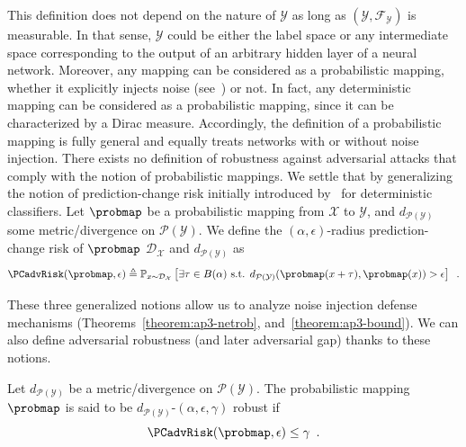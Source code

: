 This definition does not depend on the nature of $\mathcal{Y}$ as long as $(\mathcal{Y},\mathcal{F}_{\mathcal{Y}})$ is measurable.
In that sense, $\mathcal{Y}$ could be either the label space or any intermediate space corresponding to the output of an arbitrary hidden layer of a neural network.
Moreover, any mapping can be considered as a probabilistic mapping, whether it explicitly injects noise (see~\citet{lecuyer2018certified,rakin2018parametric,dhillon2018stochastic}) or not.
In fact, any deterministic mapping can be considered as a probabilistic mapping, since it can be characterized by a Dirac measure.
Accordingly, the definition of a probabilistic mapping is fully general and equally treats networks with or without noise injection.
There exists no definition of robustness against adversarial attacks that comply with the notion of probabilistic mappings.
We settle that by generalizing the notion of prediction-change risk initially introduced by~\citet{diochnos2018adversarial} for deterministic classifiers.
Let $\probmap$ be a probabilistic mapping from $\mathcal{X}$ to $\mathcal{Y}$, and $d_{\mathcal{P}(\mathcal{Y})}$ some metric/divergence on $\mathcal{P}(\mathcal{Y})$.
We define the $(\alpha,\epsilon)$-radius prediction-change risk of $\probmap$ \wrt $\mathcal{D}_{\mathcal{X}}$ and $d_{\mathcal{P}(\mathcal{Y})}$ as 
\begin{equation}
  \PCadvRisk(\probmap,\epsilon) \triangleq  \mathbb{P}_{x\sim \mathcal{D}_{\mathcal{X}}}\left[ \exists \tau \in B(\alpha) \text{ s.t. } d_{\mathcal{P}(\mathcal{Y})}(\probmap(x+\tau),\probmap(x)) > \epsilon \right] \enspace.
\end{equation}

\noindent
These three generalized notions allow us to analyze noise injection defense mechanisms (Theorems~\ref{theorem:ap3-netrob}, and~\ref{theorem:ap3-bound}).
We can also define adversarial robustness (and later adversarial gap) thanks to these notions. 
\begin{definition} \label{def::GeneralizedRobustness}
  Let $d_{\mathcal{P}(\mathcal{Y})}$ be a metric/divergence on $\mathcal{P}(\mathcal{Y})$.
  The probabilistic mapping $\probmap$ is said to be $d_{\mathcal{P}(\mathcal{Y})}$-$(\alpha, \epsilon, \gamma)$ robust if 
  \begin{equation}
    \PCadvRisk(\probmap,\epsilon) \leq \gamma \enspace.
  \end{equation}
  \removespace
\end{definition}

